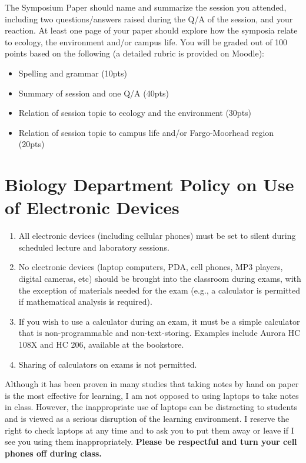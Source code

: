 \documentclass{tufte-handout}
\begin{document}
\begin{fullwidth}
The Symposium Paper should name and summarize the session you attended, including two questions/answers raised during the Q/A of the session, and your reaction. At least one page of your paper should explore how the symposia relate to ecology, the environment and/or campus life. You will be graded out of 100 points based on the following (a detailed rubric is provided on Moodle): 

\begin{itemize}
\item Spelling and grammar (10pts)
\item Summary of session and one Q/A (40pts)
\item Relation of session topic to ecology and the environment (30pts)
\item Relation of session topic to campus life and/or Fargo-Moorhead region (20pts)
\end{itemize}




\section{Biology Department Policy on Use of Electronic Devices}

\begin{enumerate}
\item All electronic devices (including cellular phones) must be set to silent during scheduled lecture and laboratory sessions.
\item No electronic devices (laptop computers, PDA, cell phones, MP3 players, digital cameras, etc) should be brought into the classroom during exams, with the exception of materials needed for the exam (e.g., a calculator is permitted if mathematical analysis is required).
\item If you wish to use a calculator during an exam, it must be a simple calculator that is non-programmable and non-text-storing. Examples include Aurora HC 108X and HC 206, available at the bookstore. 
\item Sharing of calculators on exams is not permitted.
\end{enumerate}

Although it has been proven in many studies that taking notes by hand on paper is the most effective for learning, I am not opposed to using laptops to take notes in class. However, the inappropriate use of laptops can be distracting to students and is viewed as a serious disruption of the learning environment. I reserve the right to check laptops at any time and to ask you to put them away or leave if I see you using them inappropriately. \textbf{Please be respectful and turn your cell phones off during class.}

\end{fullwidth}
\end{document}
